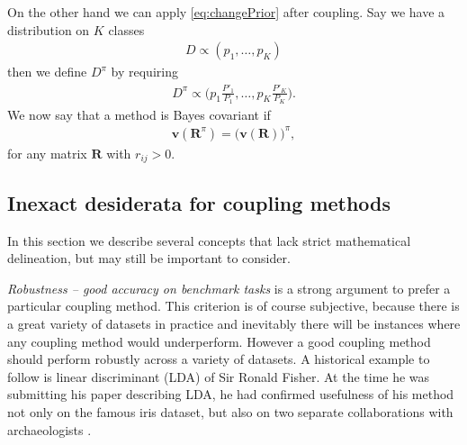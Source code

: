 On the other hand we can apply \eqref{eq:changePrior} after coupling. Say we have a distribution on $K$ classes
\begin{align}
D \propto (p_1, \ldots, p_K)
\end{align}
then we define $D^\pi$ by requiring 
\begin{align}
D^\pi \propto \biggl(p_1 \frac{P'_1}{P_1}, \ldots, p_K \frac{P'_K}{P_K}\biggr). \label{def:prior:effect}
\end{align}
We now say that a method is Bayes covariant if
\begin{align}
\boldsymbol{v}(\boldsymbol{R}^\pi)=	\bigl(\boldsymbol{v}(\boldsymbol{R})\bigr)^\pi,
\end{align}
for any matrix $\boldsymbol{R}$ with $r_{ij}> 0$.




%


\subsection{Inexact desiderata for coupling methods}

\label{sec:des:inexact}

In this section we describe several concepts that lack strict mathematical delineation, but may still be important to consider.

\emph{Robustness -- good accuracy on benchmark tasks} is  a strong argument to prefer a particular coupling method. This criterion is of course subjective, because there is a great variety of datasets in practice and inevitably there will be instances where any coupling method would underperform. However a good coupling method should perform robustly across a variety of datasets. A historical  example to follow is linear discriminant (LDA) of  Sir Ronald Fisher. At the time he was submitting his paper describing LDA, he had confirmed usefulness of his method not only on the famous iris dataset, but also on two separate collaborations with archaeologists \cite{barnard1935secular, martin1936study}. 

